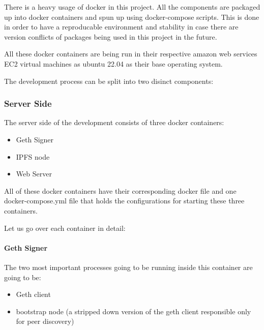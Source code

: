 \documentclass{article}
\begin{document}
There is a heavy usage of docker in this project. All the components are packaged up into docker containers and spun up using docker-compose scripts. This is done in order to have a reproducable environment and stability in case there are version conflicts of packages being used in this project in the future.

All these docker containers are being run in their respective amazon web services EC2 virtual machines as ubuntu 22.04 as their base operating system.

The development process can be split into two disinct components:

\subsubsection{Server Side}
The server side of the development consists of three docker containers:
\begin{itemize}
    \item Geth Signer
    \item IPFS node
    \item Web Server
\end{itemize}

All of these docker containers have their corresponding docker file and one docker-compose.yml file that holds the configurations for starting these three containers.

Let us go over each container in detail:

\paragraph{Geth Signer}
The two most important processes going to be running inside this container are going to be:
\begin{itemize}
    \item Geth client
    \item bootstrap node (a stripped down version of the geth client responsible only for peer discovery)
\end{itemize}
\end{document}
